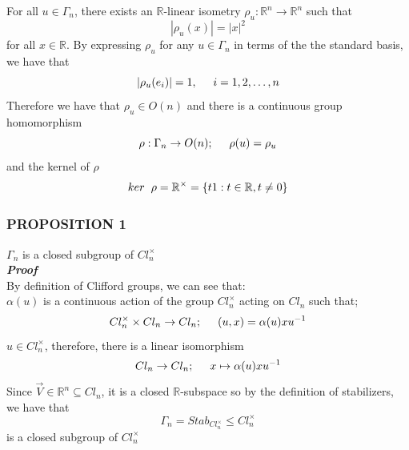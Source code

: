 \documentclass[12pt,onecolumn,letterpaper]{article} %
\begin{document}
\begin{itemize}
For all $u\in \Gamma_n$, there exists an $\mathbb{R}$-linear isometry $\rho_u : \mathbb{R}^n\to\mathbb{R}^n $ such that
$$|\rho_u(x)|=|x|^2$$
for all $x\in \mathbb{R}$.
By expressing $\rho_u$ for any $u\in\Gamma_n$ in terms of the the standard basis, we have that
$$|\rho_u(e_i)|=1, \hspace{.5cm} i=1,2,\dots, n$$
Therefore we have that $\rho_u\in O(n)$ and there is a continuous group homomorphism
\begin{equation}
    \rho :  \Gamma_n\to O(n); \hspace{.5cm}\rho(u)=\rho_u
\end{equation}
and the kernel of $\rho$
\begin{equation}
    ker\hspace{.2cm}\rho =\mathbb{R}^{\times}= \{t1 : t\in \mathbb{R}, t\neq0\}
\end{equation}
\end{itemize}
 \subsubsection{PROPOSITION 1}\label{prop1}
 $\Gamma_n$ is a closed subgroup of $Cl_n^{\times}$\\
 \textbf{\emph{Proof}}\\ 
 By definition of Clifford groups, we can see that:\\
$\alpha(u)$ is a continuous action of the group $Cl_n^{\times}$ acting on $Cl_n$ such that;
$$Cl_n^{\times}\times Cl_n\to Cl_n;\hspace{.5cm}(u,x)=\alpha(u)xu^{-1}$$
 $u\in Cl_n^{\times}$, therefore, there is a linear isomorphism
 $$Cl_n\to Cl_n;\hspace{.5cm}x\mapsto\alpha(u)xu^{-1}$$
 Since $\vec{V}\in \mathbb{R}^n\subseteq Cl_n$, it is a closed $\mathbb{R}$-subspace so by the definition of stabilizers, we have that
 $$\Gamma_n=Stab_{Cl_n^{\times}}\le Cl_n^{\times}$$
 is a closed subgroup of $Cl_n^{\times}$
\end{document}
